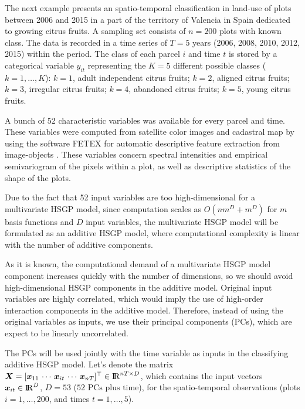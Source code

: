 \documentclass[onecolumn,a4paper,11pt]{article}
\begin{document}
The next example presents an spatio-temporal classification in land-use of plots between 2006 and 2015 in a part of the territory of Valencia in Spain dedicated to growing citrus fruits. A sampling set consists of $n=200$ plots with known class. The data is recorded in a time series of $T=5$ years (2006, 2008, 2010, 2012, 2015) within the period. The class of each parcel $i$ and time $t$ is stored by a categorical variable $y_{it}$ representing the $K=5$ different possible classes ($k=1,\dots,K$): $k=1$, adult independent citrus fruits; $k=2$, aligned citrus fruits; $k=3$, irregular citrus fruits; $k=4$, abandoned citrus fruits; $k=5$, young citrus fruits. 

A bunch of 52 characteristic variables was available for every parcel and time. These variables were computed from satellite color images and cadastral map by using the software FETEX for automatic descriptive feature extraction from image-objects \citep{ruiz2011feature}. These variables concern spectral intensities and empirical semivariogram of the pixels within a plot, as well as descriptive statistics of the shape of the plots.

Due to the fact that 52 input variables are too high-dimensional for a multivariate HSGP model, since computation scales as $O(n m^D+m^D)$ for $m$ basis functions and $D$ input variables, the multivariate HSGP model will be formulated as an additive HSGP model, where computational complexity is linear with the number of additive components. 

As it is known, the computational demand of a multivariate HSGP model component increases quickly with the number of dimensions, so we should avoid high-dimensional HSGP components in the additive model. Original input variables are highly correlated, which would imply the use of high-order interaction components in the additive model. Therefore, instead of using the original variables as inputs, we use their principal components (PCs), which are expect to be linearly uncorrelated. %

The PCs will be used jointly with the time variable as inputs in the classifying additive HSGP model. Let's denote the matrix $\bm{X}=[\bm{x}_{11}\, \cdots \, \bm{x}_{it} \, \cdots \, \bm{x}_{nT}]^\top \in {\rm I\!R}^{nT\times D}$, which contains the input vectors $\bm{x}_{it} \in {\rm I\!R}^D$, $D=53$ ($52 \text{ PCs plus time}$), for the spatio-temporal observations (plots $i=1,\dots,200$, and times $t=1,\dots,5$). 
\end{document}
